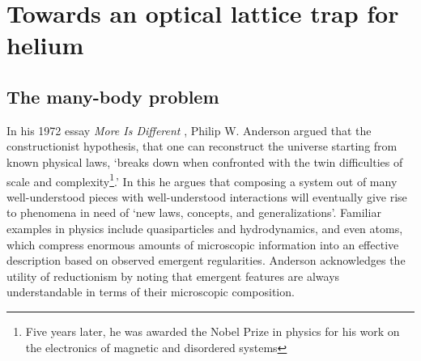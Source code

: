 
\chapter{Towards an optical lattice trap for helium}
\label{chap:lattice}



	\begingroup
	\begin{flushright}
	
	\end{flushright}
	\onehalfspacing
	\endgroup
	\vspace{1cm}


\section{The many-body problem}


	In his 1972 essay \emph{More Is Different} \cite{Anderson72},  Philip W. Anderson argued that the constructionist hypothesis, that one can reconstruct the universe starting from known physical laws,  `breaks down when confronted with the twin difficulties of scale and complexity\footnote{Five years later, he was awarded the Nobel Prize in physics for his work on the electronics of magnetic and disordered systems}.' 
	In this he argues that composing a system out of many well-understood pieces with well-understood interactions will eventually give rise to  phenomena in need of `new laws, concepts, and generalizations'.
	Familiar examples in physics include quasiparticles and hydrodynamics, and even atoms, which compress enormous amounts of microscopic information into an effective description based on observed emergent regularities.
	Anderson acknowledges the utility of reductionism by noting that emergent features are always understandable in terms of their microscopic composition.


